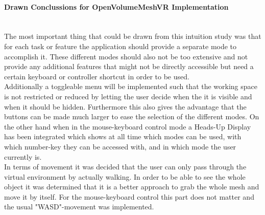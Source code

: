 \documentclass{report}
\begin{document}
			\paragraph{Drawn Conclussions for OpenVolumeMeshVR Implementation} \hfill \\
			The most important thing that could be drawn from this intuition study was that for each task or feature the application should provide a separate mode to accomplish it. These different modes should also not be too extensive and not provide any additional features that might not be directly accessible but need a certain keyboard or controller shortcut in order to be used. \\
			Additionally a toggleable menu will be implemented such that the working space is not restricted or reduced by letting the user decide when the it is visible and when it should be hidden. Furthermore this also gives the advantage that the buttons can be made much larger to ease the selection of the different modes. On the other hand when in the mouse-keyboard control mode a Heads-Up Display has been integrated which shows at all time which modes can be used, with which number-key they can be accessed with, and in which mode the user currently is.  \\
			In terms of movement it was decided that the user can only pass through the virtual environment by actually walking. In order to be able to see the whole object it was determined that it is a better approach to grab the whole mesh and move it by itself. For the mouse-keyboard control this part does not matter and the usual "WASD"-movement was implemented.			
		\closesection
	\closesection
		
		
\end{document}
